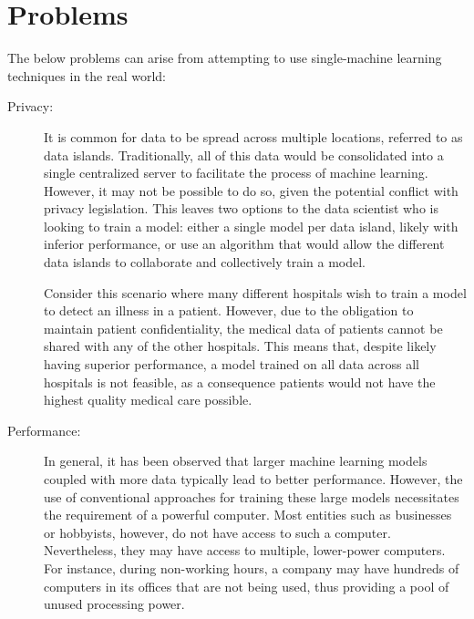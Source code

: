 \section{Problems} \label{problems}
The below problems can arise from attempting to use single-machine learning techniques in the real world:
\begin{description}
	\item[Privacy:] It is common for data to be spread across multiple locations, referred to as data islands. Traditionally, all of this data would be consolidated into a single centralized server to facilitate the process of machine learning. However, it may not be possible to do so, given the potential conflict with privacy legislation. This leaves two options to the data scientist who is looking to train a model: either a single model per data island, likely with inferior performance, or use an algorithm that would allow the different data islands to collaborate and collectively train a model.
	
	Consider this scenario where many different hospitals wish to train a model to detect an illness in a patient. However, due to the obligation to maintain patient confidentiality, the medical data of patients cannot be shared with any of the other hospitals. This means that, despite likely having superior performance, a model trained on all data across all hospitals is not feasible, as a consequence patients would not have the highest quality medical care possible.
	
	\item[Performance:] In general, it has been observed that larger machine learning models coupled with more data typically lead to better performance. However, the use of conventional approaches for training these large models necessitates the requirement of a powerful computer. Most entities such as businesses or hobbyists, however, do not have access to such a computer. Nevertheless, they may have access to multiple, lower-power computers. For instance, during non-working hours, a company may have hundreds of computers in its offices that are not being used, thus providing a pool of unused processing power.
\end{description}

